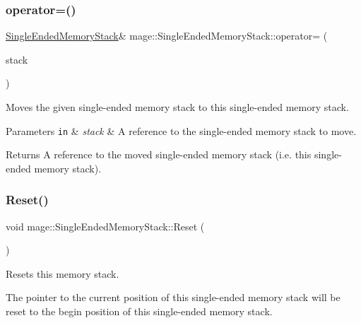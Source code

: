 \subsubsection{\texorpdfstring{operator=()}{operator=()}\hspace{0.1cm}{\footnotesize\ttfamily [2/2]}}
{\footnotesize\ttfamily \mbox{\hyperlink{classmage_1_1_single_ended_memory_stack}{Single\+Ended\+Memory\+Stack}}\& mage\+::\+Single\+Ended\+Memory\+Stack\+::operator= (\begin{DoxyParamCaption}\item[{\mbox{\hyperlink{classmage_1_1_single_ended_memory_stack}{Single\+Ended\+Memory\+Stack}} \&\&}]{stack }\end{DoxyParamCaption})\hspace{0.3cm}{\ttfamily [delete]}}

Moves the given single-\/ended memory stack to this single-\/ended memory stack.


\begin{DoxyParams}[1]{Parameters}
\mbox{\tt in}  & {\em stack} & A reference to the single-\/ended memory stack to move. \\
\hline
\end{DoxyParams}
\begin{DoxyReturn}{Returns}
A reference to the moved single-\/ended memory stack (i.\+e. this single-\/ended memory stack). 
\end{DoxyReturn}
\mbox{\label{classmage_1_1_single_ended_memory_stack_abd43ab7bd76655265123b934ea2bc7a7}} 
\subsubsection{\texorpdfstring{Reset()}{Reset()}}
{\footnotesize\ttfamily void mage\+::\+Single\+Ended\+Memory\+Stack\+::\+Reset (\begin{DoxyParamCaption}{ }\end{DoxyParamCaption})\hspace{0.3cm}{\ttfamily [noexcept]}}

Resets this memory stack.

The pointer to the current position of this single-\/ended memory stack will be reset to the begin position of this single-\/ended memory stack. \mbox{\label{classmage_1_1_single_ended_memory_stack_afa1fcaa95a61995234759f9c57723202}} 
